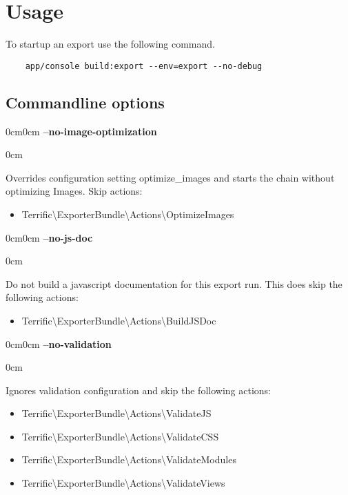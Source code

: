 \newcommand{\cmdoptiondesc}[2]{
    \begin{adjustwidth}{0cm}{0cm}
        \noindent \textbf{#1}\\
        \vspace{-1em}
        \begin{adjustwidth}{\parindent}{0cm}
            #2
        \end{adjustwidth}
    \end{adjustwidth}
    \vspace{1em}
}


\section{Usage}

To startup an export use the following command.

\begin{verbatim}
    app/console build:export --env=export --no-debug
\end{verbatim}



\subsection{Commandline options}

\cmdoptiondesc{--no-image-optimization}{
    Overrides configuration setting optimize\_images and starts the chain without optimizing Images. Skip actions:
    \begin{itemize}
          \item{Terrific\textnormal{\textbackslash}ExporterBundle\textnormal{\textbackslash}Actions\textnormal{\textbackslash}OptimizeImages}
    \end{itemize}
}

\cmdoptiondesc{--no-js-doc} {
    Do not build a javascript documentation for this export run. This does skip the following actions:
    \begin{itemize}
        \item{Terrific\textnormal{\textbackslash}ExporterBundle\textnormal{\textbackslash}Actions\textnormal{\textbackslash}BuildJSDoc}
    \end{itemize}
}

\cmdoptiondesc{--no-validation} {
    Ignores validation configuration and skip the following actions:
    \begin{itemize}
          \item{Terrific\textnormal{\textbackslash}ExporterBundle\textnormal{\textbackslash}Actions\textnormal{\textbackslash}ValidateJS}
          \item{Terrific\textnormal{\textbackslash}ExporterBundle\textnormal{\textbackslash}Actions\textnormal{\textbackslash}ValidateCSS}
          \item{Terrific\textnormal{\textbackslash}ExporterBundle\textnormal{\textbackslash}Actions\textnormal{\textbackslash}ValidateModules}
          \item{Terrific\textnormal{\textbackslash}ExporterBundle\textnormal{\textbackslash}Actions\textnormal{\textbackslash}ValidateViews}
    \end{itemize}
}



